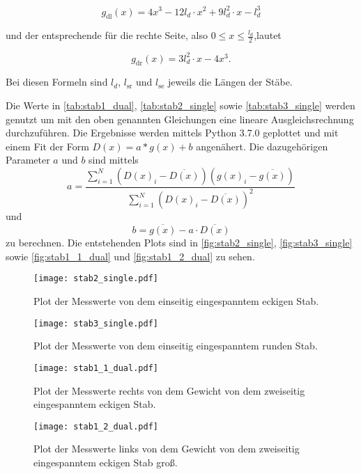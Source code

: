 \begin{equation}
  g_\text{dl}(x) = 4x^3 - 12l_d \cdot x^2 + 9l_d^2 \cdot x - l_d^3
\end{equation}

und der entsprechende für die rechte Seite, also $0 \leq x \leq \frac{l_d}{2}$,lautet

\begin{equation}
  g_\text{dr}(x) = 3 l_d^2 \cdot x - 4x^3.
\end{equation}

Bei diesen Formeln sind $l_d$, $l_\text{sr}$ und $l_\text{se}$ jeweils die Längen der Stäbe.







Die Werte in \autoref{tab:stab1_dual}, \autoref{tab:stab2_single} sowie \autoref{tab:stab3_single} werden genutzt um mit den oben genannten Gleichungen eine lineare Ausgleichsrechnung durchzuführen.
Die Ergebnisse werden mittels Python 3.7.0 geplottet und mit einem Fit der Form $D(x) = a * g(x) + b$ angenähert.
Die dazugehörigen Parameter $a$ und $b$ sind mittels
\begin{equation}
\label{eqn:a}
  a = \frac {\sum_{i=1}^N (D(x)_i - \overline{D(x)}) (g(x)_i - \overline{g(x)})}{\sum_{i=1}^N (D(x)_i - \overline{D(x)})^2}
\end{equation}
und
\begin{equation}
\label{eqn:b}
  b = \overline{g(x)} - a \cdot \overline{D(x)}
\end{equation}
zu berechnen.
Die entstehenden Plots sind in \autoref{fig:stab2_single}, \autoref{fig:stab3_single} sowie \autoref{fig:stab1_1_dual} und \autoref{fig:stab1_2_dual} zu sehen.

\begin{figure}
  \centering
  \texttt{[image: stab2\_single.pdf]}
  \caption{Plot der Messwerte von dem einseitig eingespanntem eckigen Stab.}
  \label{fig:stab1-plot}
\end{figure}

\begin{figure}
  \centering
  \texttt{[image: stab3\_single.pdf]}
  \caption{Plot der Messwerte von dem einseitig eingespanntem runden Stab.}
  \label{fig:stab1-plot}
\end{figure}

\begin{figure}
  \centering
  \texttt{[image: stab1\_1\_dual.pdf]}
  \caption{Plot der Messwerte rechts von dem Gewicht von dem zweiseitig eingespanntem eckigen Stab.}
  \label{fig:stab1_1-plot}
\end{figure}

\begin{figure}
  \centering
  \texttt{[image: stab1\_2\_dual.pdf]}
  \caption{Plot der Messwerte links von dem Gewicht von dem zweiseitig eingespanntem eckigen Stab groß.}
  \label{fig:stab1_2-plot}
\end{figure}
